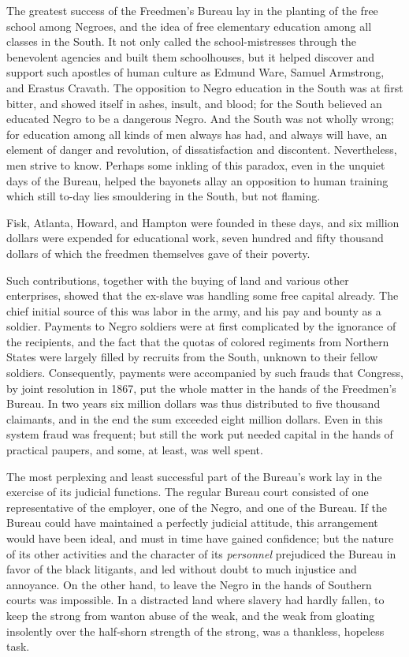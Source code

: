 The greatest success of the Freedmen’s Bureau lay in the planting of the free school among Negroes, and the idea of free elementary education among all classes in the South. It not only called the school-mistresses through the benevolent agencies and built them schoolhouses, but it helped discover and support such apostles of human culture as Edmund Ware, Samuel Armstrong, and Erastus Cravath. The opposition to Negro education in the South was at first bitter, and showed itself in ashes, insult, and blood; for the South believed an educated Negro to be a dangerous Negro. And the South was not wholly wrong; for education among all kinds of men always has had, and always will have, an element of danger and revolution, of dissatisfaction and discontent. Nevertheless, men strive to know. Perhaps some inkling of this paradox, even in the unquiet days of the Bureau, helped the bayonets allay an opposition to human training which still to-day lies smouldering in the South, but not flaming.\par

Fisk, Atlanta, Howard, and Hampton were founded in these days, and six million dollars were expended for educational work, seven hundred and fifty thousand dollars of which the freedmen themselves gave of their poverty.\par

Such contributions, together with the buying of land and various other enterprises, showed that the ex-slave was handling some free capital already. The chief initial source of this was labor in the army, and his pay and bounty as a soldier. Payments to Negro soldiers were at first complicated by the ignorance of the recipients, and the fact that the quotas of colored regiments from Northern States were largely filled by recruits from the South, unknown to their fellow soldiers. Consequently, payments were accompanied by such frauds that Congress, by joint resolution in 1867, put the whole matter in the hands of the Freedmen’s Bureau. In two years six million dollars was thus distributed to five thousand claimants, and in the end the sum exceeded eight million dollars. Even in this system fraud was frequent; but still the work put needed capital in the hands of practical paupers, and some, at least, was well spent.\par

The most perplexing and least successful part of the Bureau’s work lay in the exercise of its judicial functions. The regular Bureau court consisted of one representative of the employer, one of the Negro, and one of the Bureau. If the Bureau could have maintained a perfectly judicial attitude, this arrangement would have been ideal, and must in time have gained confidence; but the nature of its other activities and the character of its \textit{personnel} prejudiced the Bureau in favor of the black litigants, and led without doubt to much injustice and annoyance. On the other hand, to leave the Negro in the hands of Southern courts was impossible. In a distracted land where slavery had hardly fallen, to keep the strong from wanton abuse of the weak, and the weak from gloating insolently over the half-shorn strength of the strong, was a thankless, hopeless task.\par

